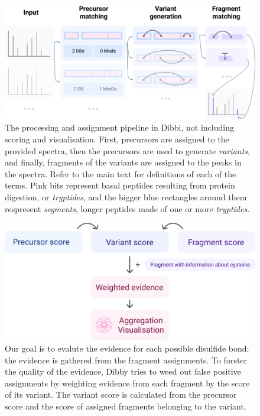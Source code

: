\begin{figure}
	\centering
	\includegraphics[width=\linewidth]{img/pipeline.pdf}
	\caption{The processing and assignment pipeline in Dibbi, not including scoring and visualisation. First, precursors are assigned to the provided spectra, then the precursors are used to generate \emph{variants}, and finally, fragments of the variants are assigned to the peaks in the spectra. Refer to the main text for definitions of each of the terms. Pink bits represent basal peptides resulting from protein digestion, or \emph{tryptides}, and the bigger blue rectangles around them respresent \emph{segments}, longer peptides made of one or more \emph{tryptides}.}\label{fig:pipeline}

\end{figure}

\begin{figure}
	\centering
	\includegraphics[width=0.9\linewidth]{img/score-calculation.pdf}
	\caption{Our goal is to evalute the evidence for each possible disulfide bond; the evidence is gathered from the fragment assignments. To forster the quality of the evidence, Dibby tries to weed out false positive assignments by weighting evidence from each fragment by the score of its variant. The variant score is calculated from the precursor score and the score of assigned fragments belonging to the variant.}\label{fig:score-calculation}
\end{figure}


